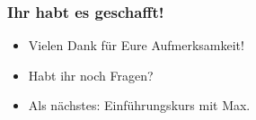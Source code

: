 \documentclass[10pt]{beamer}
\begin{document}
\begin{frame}
	\frametitle{Ihr habt es geschafft!}

	\begin{itemize}
		\item Vielen Dank für Eure Aufmerksamkeit!
		\item Habt ihr noch Fragen? 
		\item Als nächstes: Einführungskurs mit Max.
	\end{itemize}
\end{frame}
\end{document}
